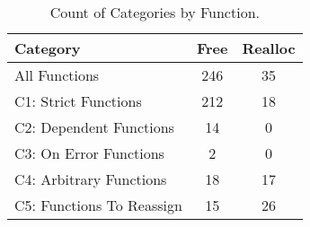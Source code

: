 \begin{table}[H]
   \begin{center}
   \begin{tabularx}{0.6\linewidth}{l|c|c}

      Category & Free & Realloc \\
      \hline

      All Functions& 246 & 35 \\

      C1: Strict Functions& 212 & 18 \\

      C2: Dependent Functions& 14 & 0 \\

      C3: On Error Functions& 2 & 0 \\

      C4: Arbitrary Functions& 18 & 17 \\

      C5: Functions To Reassign& 15 & 26 \\

   \end{tabularx}
\end{center}
   \caption{Count of Categories by Function.}
   \label{tab:categories:overview}
\end{table}

